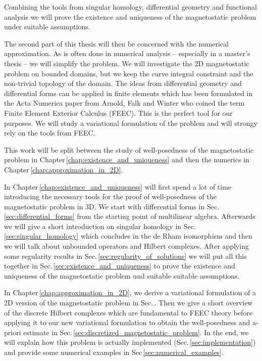 \documentclass[../master_thesis.tex]{subfiles}
\begin{document}
Combining the tools from singular homology, differential geometry and 
functional analysis we will prove the existence and uniqueness of the magnetostatic problem 
under suitable assumptions.

The second part of this thesis will then be concerned with the numerical approximation. 
As is often done in numerical analysis -- especially in a master's thesis -- we 
will simplify the problem. We will investigate the 2D magnetostatic problem on bounded domains, 
but we keep the curve integral 
constraint and the non-trivial topology of the domain. The ideas from differential geometry and 
differential forms can be applied in finite elements
which has been formulated in the Acta Numerica paper from Arnold, Falk and Winter 
\cite{arnold_falk_winther} who coined the term Finite Element Exterior Calculus (FEEC). This is the perfect 
tool for our purposes. We will study a variational formulation of the problem 
and will strongy rely on the tools from FEEC.


This work will be split between the study of well-posedness of the magnetostatic problem 
in Chapter\,\ref{chap:existence_and_uniqueness} and then the numerics in Chapter\,\ref{chap:approximation_in_2D}.

In Chapter\,\ref{chap:existence_and_uniqueness} will first spend a lot of time 
introducing the necessary tools for the proof of well-posedness of the magnetostatic problem 
in 3D. We start with differential forms in Sec.\,\ref{sec:differential_forms} from the starting point 
of multilinear algebra. Afterwards we will give a short introduction on 
singular homology in Sec.\,\ref{sec:singular_homology} which concludes in the de Rham isomorphism and then 
we will talk about unbounded operators and Hilbert 
complexes. After applying some regularity results in Sec.\,\ref{sec:regularity_of_solutions}
we will put all this together in Sec.\,\ref{sec:existence_and_uniqueness} to prove the existence and uniqueness 
of the magnetostatic problem und suitable suitable assumptions.

In Chapter\,\ref{chap:approximation_in_2D}, we derive a variational formulation of a 2D version of the 
magnetostatic problem in Sec.\,. Then we give a short overview of the discrete Hilbert complexes 
which are fundamental to FEEC theory before applying it to our new variational formulation 
to obtain the well-posedness and a-priori estimate in Sec.\,\ref{sec:discretized_magnetostatic_problem}. 
In the end, we will explain how this 
problem is actually implemented (Sec.\,\ref{sec:implementation}) 
and provide some numerical examples in Sec\,\ref{sec:numerical_examples}.
\end{document}

